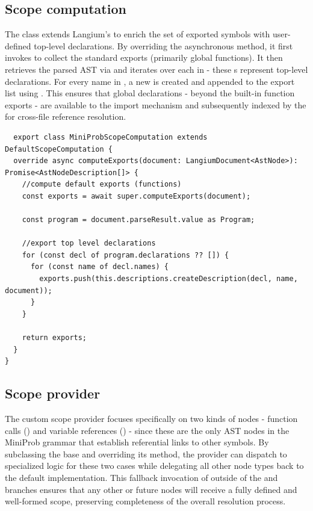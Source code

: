 \subsection*{Scope computation}
The  class extends Langium's  to enrich the set of exported symbols with user-defined top-level declarations. By overriding the asynchronous  method, it first invokes  to collect the standard exports (primarily global functions). It then retrieves the parsed  AST via  and iterates over each  in  - these s represent top-level declarations. For every name in , a new  is created and appended to the export list using . This ensures that global declarations - beyond the built-in function exports - are available to the import mechanism and subsequently indexed by the  for cross-file reference resolution.
\begin{verbatim}
  export class MiniProbScopeComputation extends DefaultScopeComputation {
  override async computeExports(document: LangiumDocument<AstNode>): Promise<AstNodeDescription[]> {
    //compute default exports (functions)
    const exports = await super.computeExports(document);

    const program = document.parseResult.value as Program;

    //export top level declarations
    for (const decl of program.declarations ?? []) {
      for (const name of decl.names) {
        exports.push(this.descriptions.createDescription(decl, name, document));
      }
    }

    return exports;
  }
}
\end{verbatim}

\subsection*{Scope provider}

The custom scope provider focuses specifically on two kinds of nodes - function calls () and variable references () - since
these are the only AST nodes in the MiniProb grammar that establish referential links to other symbols. By subclassing the base  and overriding
its  method, the provider can dispatch to specialized logic for these two cases while delegating all other node types back to the default implementation.
This fallback invocation of  outside of the  and  branches ensures that any other or future nodes will receive a fully defined and well-formed scope, preserving completeness of the overall resolution process.

